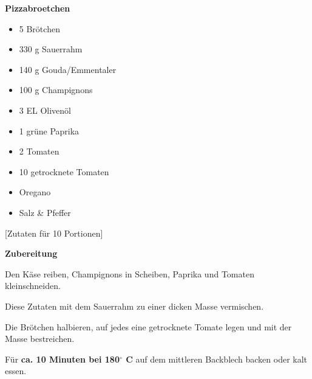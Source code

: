 

\parindent0pt	

\pagestyle{empty}


\textbf{{\LARGE Pizzabroetchen}}%

\hrulefill
\vspace*{\fill}
\begin{multicols}{2}	


\begin{itemize}
\item 5		Brötchen
\item 330 g 	Sauerrahm
\item 140 g	Gouda/Emmentaler
\item 100 g	Champignons
\item 3	EL 	Olivenöl	
\item 1 	grüne Paprika
\item 2 	Tomaten
\item 10 	getrocknete Tomaten		
\item Oregano
\item Salz \& Pfeffer
\end{itemize}
\end{multicols}
\vfill									%

\vspace{2cm}
%
\begin{center}
%
[Zutaten für 10 Portionen]%
\end{center}


\vfill
\newpage
\textbf{{\LARGE Zubereitung}}%

\hrulefill

\vspace*{\fill}
\begin{multicols}{2}

Den Käse reiben, Champignons in Scheiben, Paprika und Tomaten kleinschneiden.\newline

Diese Zutaten mit dem Sauerrahm zu einer dicken Masse
vermischen.\newline


Die Brötchen halbieren, auf jedes eine getrocknete Tomate legen
und mit der Masse bestreichen.\newline


Für \textbf{ca. 10 Minuten bei 180$^\circ$ C} auf dem mittleren Backblech backen oder kalt
essen.\newline





\end{multicols}
\vfill
